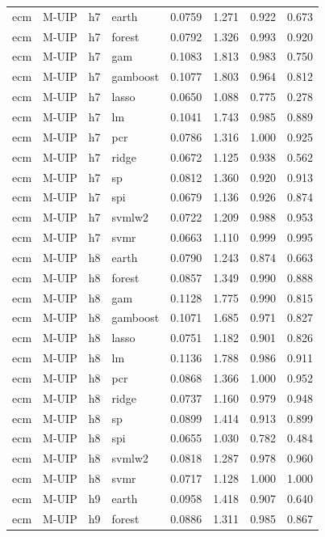 \begin{ThreePartTable}
\begin{longtable}[t]{llclcccc}
\addlinespace
ecm & M-UIP & h7 & earth & 0.0759 & 1.271 & 0.922 & 0.673\\
ecm & M-UIP & h7 & forest & 0.0792 & 1.326 & 0.993 & 0.920\\
ecm & M-UIP & h7 & gam & 0.1083 & 1.813 & 0.983 & 0.750\\
ecm & M-UIP & h7 & gamboost & 0.1077 & 1.803 & 0.964 & 0.812\\
ecm & M-UIP & h7 & lasso & 0.0650 & 1.088 & 0.775 & 0.278\\
ecm & M-UIP & h7 & lm & 0.1041 & 1.743 & 0.985 & 0.889\\
ecm & M-UIP & h7 & pcr & 0.0786 & 1.316 & 1.000 & 0.925\\
ecm & M-UIP & h7 & ridge & 0.0672 & 1.125 & 0.938 & 0.562\\
ecm & M-UIP & h7 & sp & 0.0812 & 1.360 & 0.920 & 0.913\\
ecm & M-UIP & h7 & spi & 0.0679 & 1.136 & 0.926 & 0.874\\
ecm & M-UIP & h7 & svmlw2 & 0.0722 & 1.209 & 0.988 & 0.953\\
ecm & M-UIP & h7 & svmr & 0.0663 & 1.110 & 0.999 & 0.995\\
\addlinespace
ecm & M-UIP & h8 & earth & 0.0790 & 1.243 & 0.874 & 0.663\\
ecm & M-UIP & h8 & forest & 0.0857 & 1.349 & 0.990 & 0.888\\
ecm & M-UIP & h8 & gam & 0.1128 & 1.775 & 0.990 & 0.815\\
ecm & M-UIP & h8 & gamboost & 0.1071 & 1.685 & 0.971 & 0.827\\
ecm & M-UIP & h8 & lasso & 0.0751 & 1.182 & 0.901 & 0.826\\
ecm & M-UIP & h8 & lm & 0.1136 & 1.788 & 0.986 & 0.911\\
ecm & M-UIP & h8 & pcr & 0.0868 & 1.366 & 1.000 & 0.952\\
ecm & M-UIP & h8 & ridge & 0.0737 & 1.160 & 0.979 & 0.948\\
ecm & M-UIP & h8 & sp & 0.0899 & 1.414 & 0.913 & 0.899\\
ecm & M-UIP & h8 & spi & 0.0655 & 1.030 & 0.782 & 0.484\\
ecm & M-UIP & h8 & svmlw2 & 0.0818 & 1.287 & 0.978 & 0.960\\
ecm & M-UIP & h8 & svmr & 0.0717 & 1.128 & 1.000 & 1.000\\
\addlinespace
ecm & M-UIP & h9 & earth & 0.0958 & 1.418 & 0.907 & 0.640\\
ecm & M-UIP & h9 & forest & 0.0886 & 1.311 & 0.985 & 0.867\\

\end{longtable}
\end{ThreePartTable}
